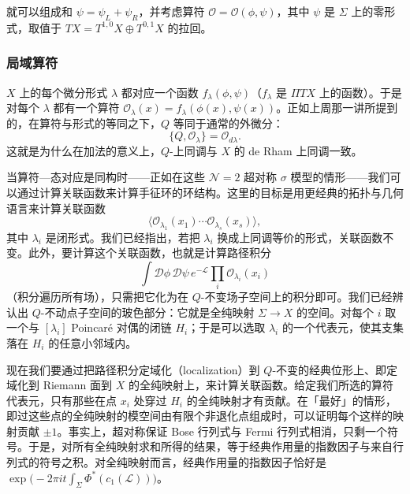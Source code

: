 
就可以组成和 $\psi=\psi_L+\psi_R$，并考虑算符 $\mathcal{O}=\mathcal{O}(\phi,\psi)$，其中 $\psi$ 是 $\Sigma$ 上的零形式，取值于 $TX=T^{1,0}X\oplus T^{0,1}X$ 的拉回。

\subsubsection{局域算符}

$X$ 上的每个微分形式 $\lambda$ 都对应一个函数 $f_\lambda(\phi,\psi)$（$f_\lambda$ 是 $\Pi TX$ 上的函数）。于是对每个 $\lambda$ 都有一个算符 $\mathcal{O}_\lambda(x)=f_\lambda(\phi(x),\psi(x))$。正如上周那一讲所提到的，在算符与形式的等同之下，$Q$ 等同于通常的外微分：
\[
  \{Q,\mathcal{O}_\lambda\}=\mathcal{O}_{d\lambda}.
\]
这就是为什么在加法的意义上，$Q$-上同调与 $X$ 的 de Rham 上同调一致。


当算符—态对应是同构时——正如在这些 $\mathcal{N}=2$ 超对称 $\sigma$ 模型的情形——我们可以通过计算关联函数来计算手征环的环结构。这里的目标是用更经典的拓扑与几何语言来计算关联函数
\[
  \langle \mathcal{O}_{\lambda_1}(x_1)\cdots\mathcal{O}_{\lambda_s}(x_s)\rangle,
\]
其中 $\lambda_i$ 是闭形式。我们已经指出，若把 $\lambda_i$ 换成上同调等价的形式，关联函数不变。此外，要计算这个关联函数，也就是计算路径积分
\[
  \int \mathcal{D}\phi\,\mathcal{D}\psi\,e^{-\mathcal{L}}\prod_i\mathcal{O}_{\lambda_i}(x_i)
\]
（积分遍历所有场），只需把它化为在 $Q$-不变场子空间上的积分即可。我们已经辨认出 $Q$-不动点子空间的玻色部分：它就是全纯映射 $\Sigma\to X$ 的空间。对每个 $i$ 取一个与 $[\lambda_i]$ Poincaré 对偶的闭链 $H_i$；于是可以选取 $\lambda_i$ 的一个代表元，使其支集落在 $H_i$ 的任意小邻域内。

现在我们要通过把路径积分定域化（localization）到 $Q$-不变的经典位形上、即定域化到 Riemann 面到 $X$ 的全纯映射上，来计算关联函数。给定我们所选的算符代表元，只有那些在点 $x_i$ 处穿过 $H_i$ 的全纯映射才有贡献。在「最好」的情形，即过这些点的全纯映射的模空间由有限个非退化点组成时，可以证明每个这样的映射贡献 $\pm1$。事实上，超对称保证 Bose 行列式与 Fermi 行列式相消，只剩一个符号。于是，对所有全纯映射求和所得的结果，等于经典作用量的指数因子与来自行列式的符号之积。对全纯映射而言，经典作用量的指数因子恰好是 $\exp\bigl(-2\pi it\int_\Sigma\Phi^*(c_1(\mathcal{L}))\bigr)$。


